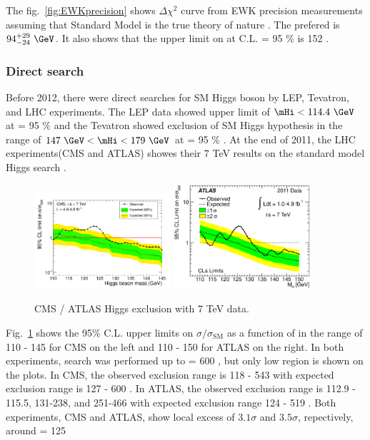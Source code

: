 The fig.~\ref{fig:EWKprecision} 
shows $\Delta \chi^2$ curve from EWK precision measurements
assuming that Standard Model is the true theory of nature \cite{LEP-2}. 
The prefered \mHi{} is $94_{-24}^{+29}~\GeV$. It also shows that 
the upper limit on \mHi at C.L. = 95 \% is 152 \GeV. 

%
\subsubsection{Direct search}  

Before 2012, there were direct searches for SM Higgs boson by LEP, Tevatron, 
and LHC experiments. 
The LEP data showed upper limit of $\mHi<114.4~\GeV$ at \CLs = 95 \% \cite{Beringer:1900zz} 
and the Tevatron showed exclusion of SM Higgs hypothesis in the range of 
$147~\GeV < \mHi < 179~\GeV$ at \CLs = 95 \% \cite{Beringer:1900zz}. 
At the end of 2011, the LHC experiments(CMS and ATLAS) showes their 7 TeV results
on the standard model Higgs search \cite{Chatrchyan201226,Aad201249}. 
\begin{figure}[htp]
\centering
\includegraphics[width=0.45\textwidth]{figures/cls_comb_zoom.pdf}
\includegraphics[width=0.45\textwidth]{figures/fig_05b.eps}
\caption{ CMS / ATLAS Higgs exclusion with 7 TeV data. }
\label{fig:2011HiggsExp}
\end{figure}
Fig.~\ref{fig:2011HiggsExp} shows the 95\% C.L. upper limits on $\sigma/\sigma_{\textrm{SM}}$
as a function of \mHi{} in the range of 110 - 145 \GeV{} for CMS on the left and 
110 - 150 \GeV for ATLAS on the right. In both experiments, search was performed up to 
\mHi = 600 \GeV, but only low \mHi{} region is shown on the plots. 
In CMS, the observed exclusion range is 118 - 543 \GeV{} 
with expected exclusion range is 127 - 600 \GeV.     
In ATLAS, the observed exclusion range is 112.9 - 115.5, 131-238, and 251-466 \GeV{} 
with expected exclusion range 124 - 519 \GeV.  
Both experiments, CMS and ATLAS, show local excess of 
$3.1\sigma$ and $3.5\sigma$, repectively, around \mHi = 125 \GeV{} 

